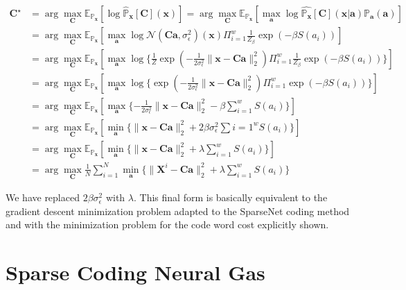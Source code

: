 \documentclass[12pt,a4paper,oneside,english]{UPBThesis}
\begin{document}
\begin{align*}
\textbf{C}^\star & = \arg\max_\textbf{C} \mathbb{E}_{\mathbb{P}_\textbf{x}} [ \log{\hat{\mathbb{P}}_\textbf{x}[\textbf{C}](\textbf{x})} ] = \arg\max_\textbf{C} \mathbb{E}_{\mathbb{P}_\textbf{x}} [ \max_\textbf{a} \log{\hat{\mathbb{P}_\textbf{x}}[\textbf{C}](\textbf{x}\left|\right.\textbf{a})\mathbb{P}_\textbf{a}(\textbf{a})} ] \\
& = \arg\max_\textbf{C} \mathbb{E}_{\mathbb{P}_\textbf{x}} [ \max_\textbf{a} \log{\mathcal{N}(\textbf{C}\textbf{a},\sigma_\epsilon^2)(\textbf{x}) \Pi_{i=1}^w{\frac{1}{Z_\beta} \exp(-\beta S(a_i))}} ] \\
& = \arg\max_\textbf{C} \mathbb{E}_{\mathbb{P}_\textbf{x}} [ \max_\textbf{a} \log{ \{ \frac{1}{Z} \exp \left( -\frac{1}{2\sigma_\epsilon^2} \| \textbf{x} - \textbf{C}\textbf{a} \|_2^2 \right) \Pi_{i=1}^w{\frac{1}{Z_\beta} \exp(-\beta S(a_i))} \} } ] \\
& = \arg\max_\textbf{C} \mathbb{E}_{\mathbb{P}_\textbf{x}} [ \max_\textbf{a} \log{ \{ \exp \left( -\frac{1}{2\sigma_\epsilon^2} \| \textbf{x} - \textbf{C}\textbf{a} \|_2^2 \right) \Pi_{i=1}^w{\exp(-\beta S(a_i))} \} } ] \\
& = \arg\max_\textbf{C} \mathbb{E}_{\mathbb{P}_\textbf{x}} [ \max_\textbf{a} \{ - \frac{1}{2\sigma_\epsilon^2} \| \textbf{x} - \textbf{C}\textbf{a} \|_2^2 - \beta \sum_{i=1}^w{S(a_i)} \} ] \\
& = \arg\max_\textbf{C} \mathbb{E}_{\mathbb{P}_\textbf{x}} [ \min_\textbf{a} \{ \| \textbf{x} - \textbf{C}\textbf{a} \|_2^2 + 2\beta\sigma_\epsilon^2\sum{i=1}^wS(a_i) \} ] \\
& = \arg\max_\textbf{C} \mathbb{E}_{\mathbb{P}_\textbf{x}} [ \min_\textbf{a} \{ \| \textbf{x} - \textbf{C}\textbf{a} \|_2^2 + \lambda\sum_{i=1}^wS(a_i) \} ] \\
& = \arg\max_\textbf{C} \frac{1}{N} \sum_{i=1}^N \min_\textbf{a} \{ \| \textbf{X}^i - \textbf{C}\textbf{a} \|_2^2 + \lambda\sum_{i=1}^wS(a_i) \}
\end{align*}

We have replaced $2\beta\sigma_\epsilon^2$ with $\lambda$. This final form is basically equivalent to the gradient descent minimization problem adapted to the SparseNet coding method and with the minimization problem for the code word cost explicitly shown.

\section{Sparse Coding Neural Gas}
\label{sec:SparseCodingNeuralGas}
\end{document}
